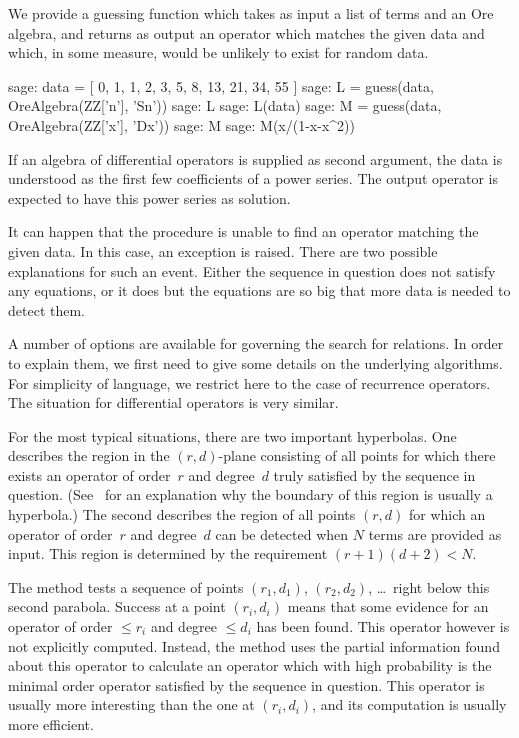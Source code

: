 \documentclass{amsart}
\begin{document}
We provide a guessing function which takes as input a list of terms and an Ore
algebra, and returns as output an operator which matches the given data and
which, in some measure, would be unlikely to exist for random data.

\begin{sageexample}
  sage: data = [ 0, 1, 1, 2, 3, 5, 8, 13, 21, 34, 55 ]
  sage: L = guess(data, OreAlgebra(ZZ['n'], 'Sn'))
  sage: L
  sage: L(data)
  sage: M = guess(data, OreAlgebra(ZZ['x'], 'Dx'))
  sage: M
  sage: M(x/(1-x-x^2))
\end{sageexample}

If an algebra of differential operators is supplied as second argument, the data
is understood as the first few coefficients of a power series. The output
operator is expected to have this power series as solution.

It can happen that the procedure is unable to find an operator matching the 
given data. In this case, an exception is raised. There are two possible 
explanations for such an event. Either the sequence in question does not 
satisfy any equations, or it does but the equations are so big that more
data is needed to detect them. 

A number of options are available for governing the search for relations.  In
order to explain them, we first need to give some details on the underlying
algorithms. For simplicity of language, we restrict here to the case of
recurrence operators. The situation for differential operators is very similar.

For the most typical situations, there are two important hyperbolas. One
describes the region in the $(r,d)$-plane consisting of all points for which
there exists an operator of order~$r$ and degree~$d$ truly satisfied by the
sequence in question. (See~\cite{jaroschek13a} for an explanation why the
boundary of this region is usually a hyperbola.) The second describes the region
of all points $(r,d)$ for which an operator of order~$r$ and degree~$d$ can be
detected when $N$ terms are provided as input. This region is determined by the
requirement $(r+1)(d+2)<N$.

The method tests a sequence of points $(r_1,d_1)$, $(r_2,d_2)$, \dots\ right
below this second parabola. Success at a point $(r_i,d_i)$ means that some
evidence for an operator of order $\leq r_i$ and degree $\leq d_i$ has been found. 
This operator however is not explicitly computed. Instead, the method uses the
partial information found about this operator to calculate an operator which with 
high probability is the minimal order operator satisfied by the sequence in question. 
This operator is usually more interesting than the one at $(r_i,d_i)$, and its 
computation is usually more efficient. 
\end{document}
